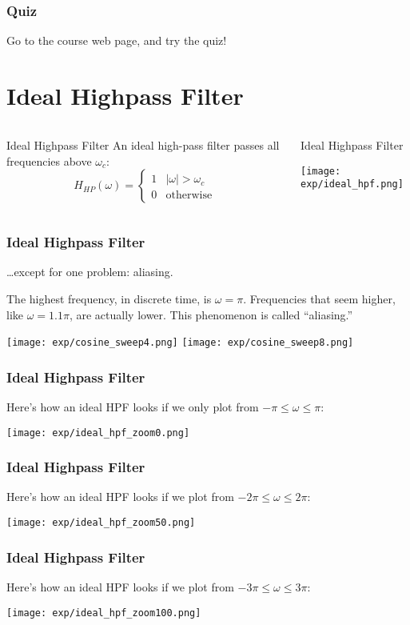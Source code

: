 \documentclass{beamer}
\begin{document}
\begin{frame}
  \frametitle{Quiz}

  Go to the course web page, and try the quiz!
\end{frame}

\section[Ideal HPF]{Ideal Highpass Filter}
\setcounter{subsection}{1}

\begin{frame}
  \begin{columns}
    \column{2.25in}
    \begin{block}{Ideal Highpass Filter}
      An ideal high-pass filter passes all frequencies above $\omega_c$:
      \[
      H_{HP}(\omega)
      = \begin{cases} 1& |\omega|>\omega_c\\
        0 & \mbox{otherwise}
      \end{cases}
      \]
    \end{block}
    \column{2.25in}
    \begin{block}{Ideal Highpass Filter}
      \centerline{\texttt{[image: exp/ideal\_hpf.png]}}
    \end{block}
  \end{columns}
\end{frame}

\begin{frame}
  \frametitle{Ideal Highpass Filter}

  \ldots except for one problem: aliasing.
  
  The highest frequency, in discrete time, is $\omega=\pi$.
  Frequencies that seem higher, like $\omega=1.1\pi$, are actually
  lower.  This phenomenon is called ``aliasing.''

  \centerline{\texttt{[image: exp/cosine\_sweep4.png]}
    \texttt{[image: exp/cosine\_sweep8.png]}}
\end{frame}

\begin{frame}
  \frametitle{Ideal Highpass Filter}
  Here's how an ideal HPF looks if we only plot from $-\pi\le\omega\le\pi$:

  \centerline{\texttt{[image: exp/ideal\_hpf\_zoom0.png]}}
\end{frame}
\begin{frame}
  \frametitle{Ideal Highpass Filter}
  Here's how an ideal HPF looks if we plot from $-2\pi\le\omega\le2\pi$:

  \centerline{\texttt{[image: exp/ideal\_hpf\_zoom50.png]}}
\end{frame}
\begin{frame}
  \frametitle{Ideal Highpass Filter}
  Here's how an ideal HPF looks if we plot from $-3\pi\le\omega\le3\pi$:

  \centerline{\texttt{[image: exp/ideal\_hpf\_zoom100.png]}}
\end{frame}
\end{document}
